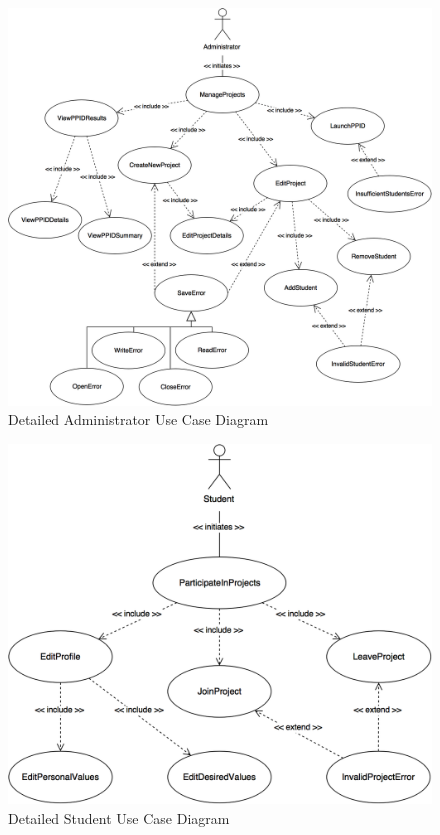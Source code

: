 \documentclass[12pt,letterpaper]{article}
\begin{document}
\begin{figure}[H]
	\centering{}
	\includegraphics[scale=0.26]{imgs/detailed-administrator-use-case-diagram.png}
	\caption{Detailed Administrator Use Case Diagram}
\end{figure}

\begin{figure}[H]
	\centering{}
	\includegraphics[scale=0.3]{imgs/detailed-student-use-case-diagram.png}
	\caption{Detailed Student Use Case Diagram}
\end{figure}
\end{document}
